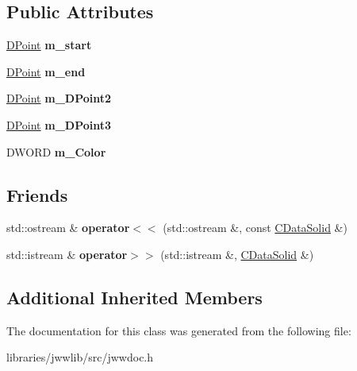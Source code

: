 \subsection*{Public Attributes}
\begin{DoxyCompactItemize}
\item 
\hypertarget{classCDataSolid_ae7b4a1d68d047725b9514f56d3da35dd}{\hyperlink{struct__DPoint}{D\-Point} {\bfseries m\-\_\-start}}\label{classCDataSolid_ae7b4a1d68d047725b9514f56d3da35dd}

\item 
\hypertarget{classCDataSolid_ab14e2ba55255bbbd92de886d9a5fb397}{\hyperlink{struct__DPoint}{D\-Point} {\bfseries m\-\_\-end}}\label{classCDataSolid_ab14e2ba55255bbbd92de886d9a5fb397}

\item 
\hypertarget{classCDataSolid_a263c7480d12769cd2cecf11de9457bda}{\hyperlink{struct__DPoint}{D\-Point} {\bfseries m\-\_\-\-D\-Point2}}\label{classCDataSolid_a263c7480d12769cd2cecf11de9457bda}

\item 
\hypertarget{classCDataSolid_a4cb9635b487407543af59aec1d64a916}{\hyperlink{struct__DPoint}{D\-Point} {\bfseries m\-\_\-\-D\-Point3}}\label{classCDataSolid_a4cb9635b487407543af59aec1d64a916}

\item 
\hypertarget{classCDataSolid_a07bfe43a4b1bdfa24c942f74e12b9b88}{D\-W\-O\-R\-D {\bfseries m\-\_\-\-Color}}\label{classCDataSolid_a07bfe43a4b1bdfa24c942f74e12b9b88}

\end{DoxyCompactItemize}
\subsection*{Friends}
\begin{DoxyCompactItemize}
\item 
\hypertarget{classCDataSolid_a1db572d9ed88ab4515d0581fc6122096}{std\-::ostream \& {\bfseries operator$<$$<$} (std\-::ostream \&, const \hyperlink{classCDataSolid}{C\-Data\-Solid} \&)}\label{classCDataSolid_a1db572d9ed88ab4515d0581fc6122096}

\item 
\hypertarget{classCDataSolid_aa9e114c12eafbc16e1249c985f230ee5}{std\-::istream \& {\bfseries operator$>$$>$} (std\-::istream \&, \hyperlink{classCDataSolid}{C\-Data\-Solid} \&)}\label{classCDataSolid_aa9e114c12eafbc16e1249c985f230ee5}

\end{DoxyCompactItemize}
\subsection*{Additional Inherited Members}


The documentation for this class was generated from the following file\-:\begin{DoxyCompactItemize}
\item 
libraries/jwwlib/src/jwwdoc.\-h\end{DoxyCompactItemize}
